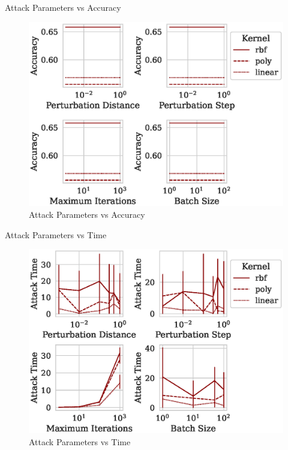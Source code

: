 \documentclass{beamer}
\begin{document}
\begin{frame}{Attack Parameters vs Accuracy}
  \begin{figure}
    \centering
    \includegraphics[width=.75\textwidth]{./generated/accuracy_vs_attack_parameters.eps}
    \caption{Attack Parameters vs Accuracy}
  \end{figure}
  \label{fig:attack_accuracy}
\end{frame}

\begin{frame}{Attack Parameters vs Time}
  \begin{figure}
    \centering
    \includegraphics[width=.75\textwidth]{./generated/train_time_vs_attack_parameters.eps}
    \caption{Attack Parameters vs Time}
  \end{figure}
\end{frame}
\end{document}
